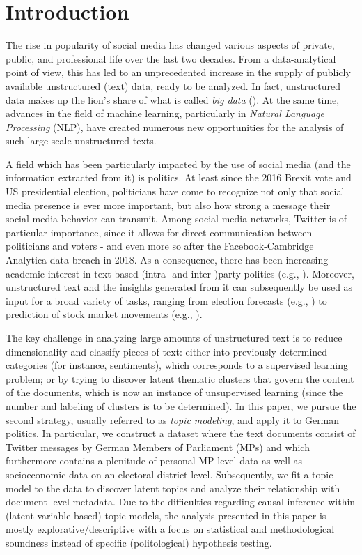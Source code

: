 \documentclass[12pt]{article}
\begin{document}
\section{Introduction}

The rise in popularity of social media has changed various aspects of private, public, and professional life over the last two decades. From a data-analytical point of view, this has led to an unprecedented increase in the supply of publicly available unstructured (text) data, ready to be analyzed. In fact, unstructured data makes up the lion's share of what is called \textit{big data} (\citealp{gandomi2015beyond}). At the same time, advances in the field of machine learning, particularly in \textit{Natural Language Processing} (NLP), have created numerous new opportunities for the analysis of such large-scale unstructured texts.

A field which has been particularly impacted by the use of social media (and the information extracted from it) is politics. At least since the 2016 Brexit vote and US presidential election, politicians have come to recognize not only that social media presence is ever more important, but also how strong a message their social media behavior can transmit. Among social media networks, Twitter is of particular importance, since it allows for direct communication between politicians and voters - and even more so after the Facebook-Cambridge Analytica data breach in 2018. As a consequence, there has been increasing academic interest in text-based (intra- and inter-)party politics (e.g., \citealp{ceron2017intra, daniel2019static, grimmer2010bayesian, quinlan2018show}). Moreover, unstructured text and the insights generated from it can subsequently be used as input for a broad variety of tasks, ranging from election forecasts (e.g., \citealp{burnap2016140, jungherr2016twitter, tumasjan2010predicting}) to prediction of stock market movements (e.g., \citealp{nisar2018twitter}).

The key challenge in analyzing large amounts of unstructured text is to reduce dimensionality and classify pieces of text: either into previously determined categories (for instance, sentiments), which corresponds to a supervised learning problem; or by trying to discover latent thematic clusters that govern the content of the documents, which is now an instance of unsupervised learning (since the number and labeling of clusters is to be determined). In this paper, we pursue the second strategy, usually referred to as \textit{topic modeling}, and apply it to German politics. In particular, we construct a dataset where the text documents consist of Twitter messages by German Members of Parliament (MPs) and which furthermore contains a plenitude of personal MP-level data as well as socioeconomic data on an electoral-district level. Subsequently, we fit a topic model to the data to discover latent topics and analyze their relationship with document-level metadata. Due to the difficulties regarding causal inference within (latent variable-based) topic models, the analysis presented in this paper is mostly explorative/descriptive with a focus on statistical and methodological soundness instead of specific (politological) hypothesis testing.
\end{document}
